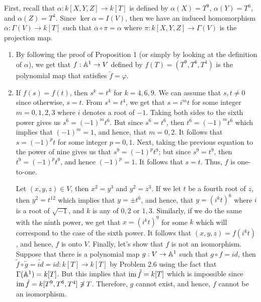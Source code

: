 \begin{solution}
    First, recall that $\alpha : k[X,Y,Z] \to k[T]$ is defined by $\alpha(X) = T^9$, $\alpha(Y) = T^6$, and $\alpha(Z) = T^4$. Since $\ker \alpha = I(V)$, then we have an induced homomorphism $\overline{\alpha} : \Gamma(V) \to k[T]$ such that $\overline{\alpha} \circ \pi = \alpha$ where $\pi : k[X,Y,Z] \to \Gamma(V)$ is the projection map. 
    \begin{enumerate}[label=(\alph*)]
        \item By following the proof of Proposition 1 (or simply by looking at the definition of $\alpha$), we get that $f : \mathbb{A}^1 \to V$ defined by $f(T) = (T^9, T^6, T^4)$ is the polynomial map that satisfies $\tilde{f} = \varphi$.
        \item If $f(s) = f(t)$, then $s^k = t^k$ for $k = 4,6,9$. We can assume that $s,t \neq 0$ since otherwise, $s = t$. From $s^4 = t^4$, we get that $s = i^mt$ for some integer $m = 0,1,2,3$ where $i$ denotes a root of $-1$. Taking both sides to the sixth power gives us $s^6 = (-1)^mt^6$. But since $s^6 = t^6$, then $t^6 = (-1)^mt^6$ which implies that $(-1)^m = 1$, and hence, that $m = 0,2$. It follows that $s = (-1)^pt$ for some integer $p = 0,1$. Next, taking the previous equation to the power of nine gives us that $s^9 = (-1)^pt^9$; but since $s^9 = t^9$, then $t^9 = (-1)^pt^9$, and hence $(-1)^p = 1$. It follows that $s = t$. Thus, $f$ is one-to-one.
        
        Let $(x,y,z) \in V$, then $x^2 = y^3$ and $y^2 = z^3$. If we let $t$ be a fourth root of $z$, then $y^2 = t^{12}$ which implies that $y = \pm t^6$, and hence, that $y = (i^kt)^6$ where $i$ is a root of $\sqrt{-1}$, and $k$ is any of $0,2$ or $1,3$. Similarly, if we do the same with the ninth power, we get that $x = (i^kt)^9$ for some $k$ which will correspond to the case of the sixth power. It follows that $(x,y,z) = f(i^k t)$, and hence, $f$ is onto $V$. Finally, let's show that $f$ is not an isomorphism. Suppose that there is a polynomial map $g : V \to \mathbb{A}^1$ such that $g \circ f = id$, then $\tilde{f} \circ \tilde{g} = \tilde{id} = id : k[T] \to k[T]$ by Problem 2.6 using the fact that $ \Gamma(\mathbb{A}^1) = k[T]$. But this implies that $\operatorname{im} \tilde{f} = k[T]$ which is impossible since $\operatorname{im} \tilde{f} = k[T^9, T^6, T^4] \not \ni T$. Therefore, $g$ cannot exist, and hence, $f$ cannot be an isomorphism. 
    \end{enumerate}
\end{solution}